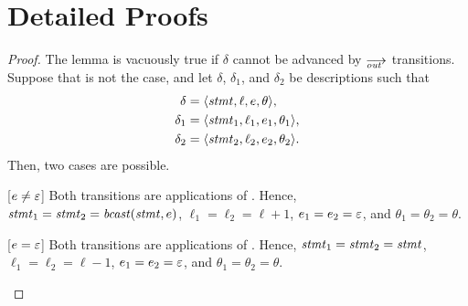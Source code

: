 \section{Detailed Proofs}
\label{sec.appendix}


\lemdetout*
\begin{proof}
  The lemma is vacuously true if $\delta$ cannot be advanced by $\out$
  transitions.  Suppose that is not the case, and let $\delta$, $\delta_1$,
  and $\delta_2$ be descriptions such that
  \begin{align*}
    \delta  &=\<\stmt,\ell,e,\theta>,\\
    \delta_1&=\<\stmt_1,\ell_1,e_1,\theta_1>,\\
    \delta_2&=\<\stmt_2,\ell_2,e_2,\theta_2>.
  \end{align*}
  Then, two cases are possible.
  \begin{case}
  \item[{[$e\ne\varepsilon$]}] Both transitions are applications of .
    Hence, $\mathit{stmt}_1=\mathit{stmt}_2=\operatorname{\mathit{bcast}}(\mathit{stmt},e)$, $\ell_1=\ell_2=\ell+1$,
    $e_1=e_2=\varepsilon$, and $\theta_1=\theta_2=\theta$.
  \item[{[$e=\varepsilon$]}] Both transitions are applications of .  Hence,
    $\mathit{stmt}_1=\mathit{stmt}_2=\mathit{stmt}$, $\ell_1=\ell_2=\ell-1$, $e_1=e_2=\varepsilon$,
    and $\theta_1=\theta_2=\theta$.\qedhere
  \end{case}
\end{proof}

